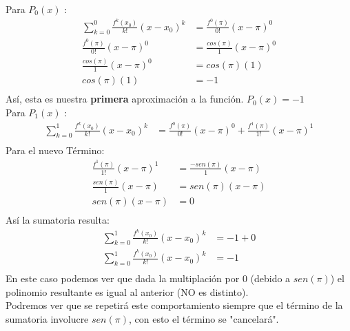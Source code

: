 Para $P_{0}(x)$ :
\begin{align*}
   \sum_{k=0}^{0} \frac{f^{k}(x_{0})}{k!}(x-x_{0})^{k} &= \frac{f^{0}(\pi)}{0!}(x-\pi)^{0} \\
   \frac{f^{0}(\pi)}{0!}(x-\pi)^{0}                    &= \frac{cos(\pi)}{1}(x-\pi)^{0} \\
   \frac{cos(\pi)}{1}(x-\pi)^{0}                       &= cos(\pi)(1) \\
   cos(\pi)(1)                                         &= -1 \\
\end{align*}
Así, esta es nuestra \textbf{primera} aproximación a la función. $P_{0}(x) = -1$ \\
Para $P_{1}(x)$ :
\begin{align*}
   \sum_{k=0}^{1} \frac{f^{k}(x_{0})}{k!}(x-x_{0})^{k} &= \frac{f^{0}(\pi)}{0!}(x-\pi)^{0} + \frac{f^{1}(\pi)}{1!}(x-\pi)^{1}\\
\end{align*}
Para el nuevo Término:
\begin{align*}
   \frac{f^{1}(\pi)}{1!}(x-\pi)^{1}                    &= \frac{-sen(\pi)}{1}(x-\pi) \\
   \frac{sen(\pi)}{1}(x-\pi)                           &= sen(\pi)(x-\pi) \\
   sen(\pi)(x-\pi)                                     &= 0 \\
\end{align*}
Así la sumatoria resulta:
\begin{align*}
   \sum_{k=0}^{1} \frac{f^{k}(x_{0})}{k!}(x-x_{0})^{k} &= -1 + 0\\
   \sum_{k=0}^{1} \frac{f^{k}(x_{0})}{k!}(x-x_{0})^{k} &= -1 \\
\end{align*}
En este caso podemos ver que dada la multiplación por 0 (debido a $sen(\pi)$) el polinomio resultante es igual al anterior (NO es distinto). \\
Podremos ver que se repetirá este comportamiento siempre que el término de la sumatoria involucre  $sen(\pi)$, con esto el término se "cancelará". \\

